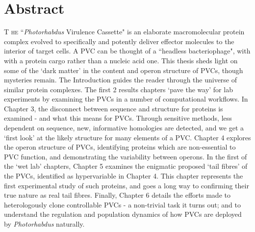\documentclass[a4paper, oneside, 11pt]{report} %
\begin{document}
\chapter*{Abstract}
\lettrine[lraise=0.0, nindent=0.1em, slope=1em]{T}{ he} ``\emph{Photorhabdus} Virulence Cassette" is an elaborate macromolecular protein complex evolved to specifically and potently deliver effector molecules to the interior of target cells. A PVC can be thought of a ``headless bacteriophage", with with a protein cargo rather than a nucleic acid one. This thesis sheds light on some of the `dark matter' in the content and operon structure of PVCs, though mysteries remain. The Introduction guides the reader through the universe of similar protein complexes. The first 2 results chapters `pave the way' for lab experiments by examining the PVCs in a number of computational workflows. In Chapter 3, the disconnect between sequence and structure for proteins is examined - and what this means for PVCs. Through sensitive methods, less dependent on sequence, new, informative homologies are detected, and we get a `first look' at the likely structure for many elements of a PVC. Chapter 4 explores the operon structure of PVCs, identifying proteins which are non-essential to PVC function, and demonstrating the variability between operons. In the first of the `wet lab' chapters, Chapter 5 examines the enigmatic proposed `tail fibres' of the PVCs, identified as hypervariable in Chapter 4. This chapter represents the first experimental study of such proteins, and goes a long way to confirming their true nature as real tail fibres. Finally, Chapter 6 details the efforts made to heterologously clone controllable PVCs - a non-trivial task it turns out; and to understand the regulation and population dynamics of how PVCs are deployed by \emph{Photorhabdus} naturally.

\newpage

\end{document}
